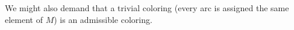%
%
%
%
%
%
%



We might also demand that a trivial coloring (every arc is assigned the same element of $M$) is an admissible coloring.


